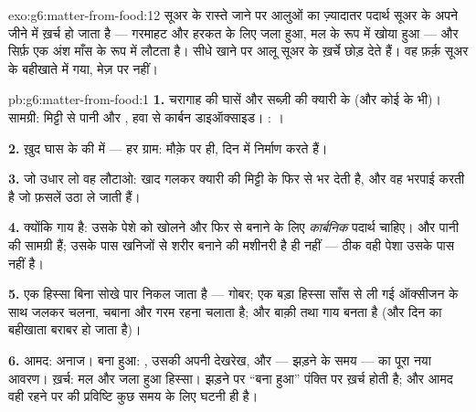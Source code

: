 \begin{solution}{exo:g6:matter-from-food:12}
सूअर के रास्ते जाने पर आलुओं का ज़्यादातर पदार्थ सूअर के अपने जीने में
ख़र्च हो जाता है --- गरमाहट और हरकत के लिए जला हुआ, मल के रूप में खोया
हुआ --- और सिर्फ़ एक अंश माँस के रूप में लौटता है। सीधे खाने पर आलू सूअर
के ख़र्चे छोड़ देते हैं। वह फ़र्क़ सूअर के बहीखाते में गया, मेज़ पर
नहीं।
\end{solution}

\begin{solution}{pb:g6:matter-from-food:1}
\textbf{1.} चरागाह की घासें और सब्ज़ी की क्यारी के  (और कोई  के
 भी)। सामग्री: मिट्टी से पानी और , हवा से कार्बन डाइऑक्साइड।
: ।

\textbf{2.} ख़ुद घास के  की  में --- हर ग्राम: 
मौक़े पर ही, दिन में निर्माण करते हैं।

\textbf{3.} जो उधार लो वह लौटाओ: खाद गलकर क्यारी की मिट्टी के 
फिर से भर देती है, और वह भरपाई करती है जो फ़सलें उठा ले जाती हैं।

\textbf{4.} क्योंकि गाय  है: उसके पेशे को खोलने और फिर से बनाने
के लिए \emph{कार्बनिक} पदार्थ चाहिए।  और पानी  की
सामग्री हैं; उसके पास खनिजों से शरीर बनाने की मशीनरी है ही नहीं ---
ठीक वही पेशा उसके पास नहीं है।

\textbf{5.} एक हिस्सा बिना सोखे पार निकल जाता है --- गोबर; एक बड़ा
हिस्सा साँस से ली गई ऑक्सीजन के साथ जलकर चलना, चबाना और गरम रहना चलाता
है; और बाक़ी  तथा गाय बनता है (और दिन का बहीखाता बराबर हो जाता है)।

\textbf{6.} आमद: अनाज। बना हुआ: , उसकी अपनी देखरेख, और --- 
झड़ने के समय ---  का पूरा नया आवरण। ख़र्च: मल और जला हुआ हिस्सा।
 झड़ने पर ``बना हुआ'' पंक्ति  पर ख़र्च होती है; और आमद वही रहने
पर  की प्रविष्टि कुछ समय के लिए घटनी ही है।


\end{solution}
